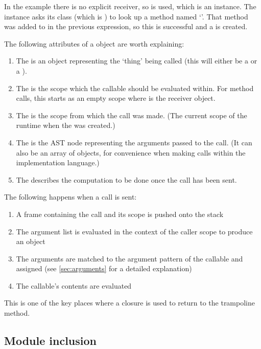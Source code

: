 In the example there is no explicit receiver, so  is used, which is an  instance. The instance asks its class (which is ) to look up a method named `'. That method was added to  in the previous expression, so this is successful and a  is created.

\newpage
The following attributes of a  object are worth explaining:

\begin{enumerate}
  \item The  is an object representing the `thing' being called (this will either be a  or a ).
  \item The  is the scope which the callable should be evaluated within. For method calls, this starts as an empty scope where  is the receiver object.
  \item The  is the scope from which the call was made. (The current scope of the runtime when the  was created.)
  \item The  is the  AST node representing the arguments passed to the call. (It can also be an array of objects, for convenience when making calls within the implementation language.)
  \item The  describes the computation to be done once the call has been sent.
\end{enumerate}

The following happens when a call is sent:

\begin{enumerate}
  \item A frame containing the call and its scope is pushed onto the stack
  \item The argument list is evaluated in the context of the caller scope to produce an  object
  \item The arguments are matched to the argument pattern of the callable and assigned (see \autoref{sec:arguments} for a detailed explanation)
  \item The callable's contents are evaluated
\end{enumerate}

This is one of the key places where a closure is used to return to the trampoline method.

\subsection{Module inclusion}
\label{sec:module_inclusion}

